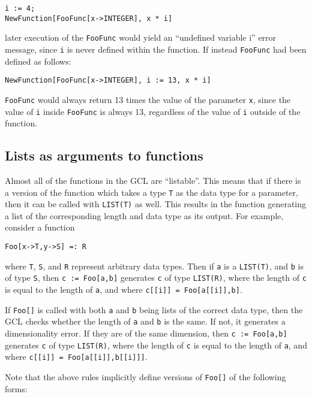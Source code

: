 \begin{verbatim}
i := 4;
NewFunction[FooFunc[x->INTEGER], x * i]
\end{verbatim}

\noindent later execution of the \verb+FooFunc+ would yield an ``undefined
variable i'' error message, since \verb+i+ is never defined within the
function.  If instead \verb+FooFunc+ had been defined as follows:

\begin{verbatim}
NewFunction[FooFunc[x->INTEGER], i := 13, x * i]
\end{verbatim}

\noindent \verb+FooFunc+ would always return 13 times the value of the
parameter \verb+x+, since the value of \verb+i+ inside \verb+FooFunc+ is
always 13, regardless of the value of \verb+i+ outside of the function.


\subsection{Lists as arguments to functions}

Almost all of the functions in the GCL are ``listable''.  This means
that if there is a version of the function which takes a type \verb+T+
as the data type for a parameter, then it can be called with
\verb+LIST(T)+ as well.  This results in the function generating a
list of the corresponding length and data type as its output.  For
example, consider a function 

\begin{verbatim}
Foo[x->T,y->S] =: R
\end{verbatim}

\noindent
where \verb+T+, \verb+S+, and \verb+R+ represent arbitrary data types.
Then if \verb+a+ is a \verb+LIST(T)+, and \verb+b+ is of type
\verb+S+, then \verb+c := Foo[a,b]+ generates \verb+c+ of type
\verb+LIST(R)+, where the length of \verb+c+ is equal to the length of
\verb+a+, and where \verb+c[[i]] = Foo[a[[i]],b]+.  

If \verb+Foo[]+ is called with both \verb+a+ and \verb+b+ being lists
of the correct data type, then the GCL checks whether the length of
\verb+a+ and \verb+b+ is the same.  If not, it generates a
dimensionality error. If they are of the same dimension, then 
\verb+c := Foo[a,b]+ generates \verb+c+ of type \verb+LIST(R)+, where the
length of \verb+c+ is equal to the length of \verb+a+, and where
\verb+c[[i]] = Foo[a[[i]],b[[i]]]+.

Note that the above rules implicitly define versions of \verb+Foo[]+
of the following forms:

